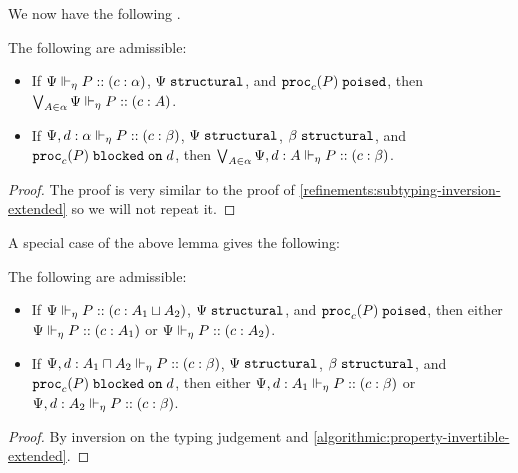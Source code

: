 
We now have the following .

\begin{lemma}
  \label{algorithmic:property-invertible-extended}
  The following are admissible:
  \begin{itemize}
    \item If ${\Psi} \Vdash_{\eta} P :: (c : \alpha)$, $\Psi\;\mathtt{structural}$, and $\mathtt{proc}_{c}(P)\;\mathtt{poised}$, then $\bigvee_{A \in \alpha}{{\Psi} \Vdash_{\eta} P :: (c : A)}$.
    \item If ${\Psi, d : \alpha} \Vdash_{\eta} P :: (c : \beta)$, $\Psi\;\mathtt{structural}$, $\beta\;\mathtt{structural}$, and ${\mathtt{proc}_{c}(P)}\;\mathtt{blocked\;on}\;{d}$, then $\bigvee_{A \in \alpha}{{\Psi, d : A} \Vdash_{\eta} P :: (c : \beta)}$.
  \end{itemize}
\end{lemma}
\begin{proof}
  The proof is very similar to the proof of \cref{refinements:subtyping-inversion-extended} so we will not repeat it.
\end{proof}

A special case of the above lemma gives the following:
\begin{corollary}
  \label{algorithmic:property-invertible-extended-corollary}
  The following are admissible:
  \begin{itemize}
    \item If ${\Psi} \Vdash_{\eta} P :: (c : A_1 \mathbin{\sqcup} A_2)$, $\Psi\;\mathtt{structural}$, and $\mathtt{proc}_{c}(P)\;\mathtt{poised}$, then either ${\Psi} \Vdash_{\eta} P :: (c : A_1)$ or ${\Psi} \Vdash_{\eta} P :: (c : A_2)$.
    \item If ${\Psi, d : A_1 \mathbin{\sqcap} A_2} \Vdash_{\eta} P :: (c : \beta)$, $\Psi\;\mathtt{structural}$, $\beta\;\mathtt{structural}$, and ${\mathtt{proc}_{c}(P)}\;\mathtt{blocked\;on}\;{d}$, then either ${\Psi, d : A_1} \Vdash_{\eta} P :: (c : \beta)$ or ${\Psi, d : A_2} \Vdash_{\eta} P :: (c : \beta)$.
  \end{itemize}
\end{corollary}
\begin{proof}
  By inversion on the typing judgement and \cref{algorithmic:property-invertible-extended}.
\end{proof}


